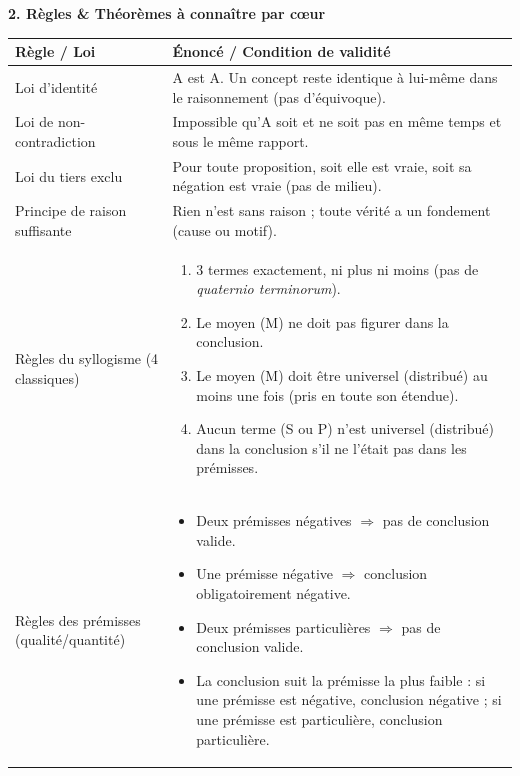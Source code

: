 \documentclass[11pt]{article}
\newcommand{\cle}[1]{{\popxbold\color{popdark}#1}}
\begin{document}
\begin{bilan}
\textbf{2. Règles \& Théorèmes à connaître par cœur}
\begin{center}
\begin{tabularx}{\linewidth}{|l|X|}\hline
\textbf{Règle / Loi} & \textbf{Énoncé / Condition de validité} \\ \hline
\cle{Loi d'identité} & A est A. Un concept reste identique à lui-même dans le raisonnement (pas d'équivoque). \\ \hline
\cle{Loi de non-contradiction} & Impossible qu'A soit et ne soit pas en même temps et sous le même rapport. \\ \hline
\cle{Loi du tiers exclu} & Pour toute proposition, soit elle est vraie, soit sa négation est vraie (pas de milieu). \\ \hline
\cle{Principe de raison suffisante} & Rien n'est sans raison ; toute vérité a un fondement (cause ou motif). \\ \hline
\cle{Règles du syllogisme (4 classiques)} & 
\begin{enumerate}
  \item 3 termes exactement, ni plus ni moins (pas de \textit{quaternio terminorum}).
  \item Le moyen (M) ne doit pas figurer dans la conclusion.
  \item Le moyen (M) doit être universel (distribué) au moins une fois (pris en toute son étendue).
  \item Aucun terme (S ou P) n'est universel (distribué) dans la conclusion s'il ne l'était pas dans les prémisses.
\end{enumerate} \\ \hline
\cle{Règles des prémisses (qualité/quantité)} & 
\begin{itemize}
  \item Deux prémisses négatives $\Rightarrow$ pas de conclusion valide.
  \item Une prémisse négative $\Rightarrow$ conclusion obligatoirement négative.
  \item Deux prémisses particulières $\Rightarrow$ pas de conclusion valide.
  \item La conclusion suit la prémisse la plus faible : si une prémisse est négative, conclusion négative ; si une prémisse est particulière, conclusion particulière.
\end{itemize} \\ \hline
\end{tabularx}
\end{center}


\end{bilan}
\end{document}
